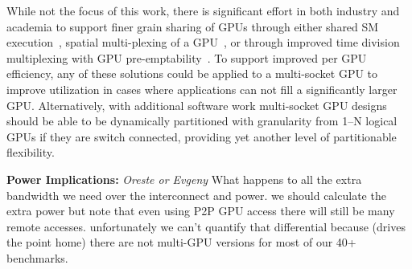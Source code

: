 While not the focus of this work,
there is significant effort in both industry and academia to support finer
grain sharing of GPUs through either shared SM execution~\cite{XXX}, spatial
multi-plexing of a GPU~\cite{XXX}, or through improved time division multiplexing
with GPU pre-emptability~\cite{XXX}.  To support improved per GPU efficiency,
any of these solutions could be applied to a multi-socket GPU to improve utilization
in cases where applications can not fill a significantly larger GPU.  Alternatively,
with additional software work multi-socket GPU designs should be able to be dynamically
partitioned with granularity from 1--N logical GPUs if they are switch connected, providing
yet another level of partitionable flexibility.

\textbf{Power Implications:} \textit{Oreste or Evgeny}
What happens to all the extra bandwidth we need over the interconnect and
power.  we should calculate the extra power but note that even using P2P GPU
access there will still be many remote accesses.  unfortunately we can't quantify
that differential because (drives the point home) there are not multi-GPU versions
for most of our 40+ benchmarks.

